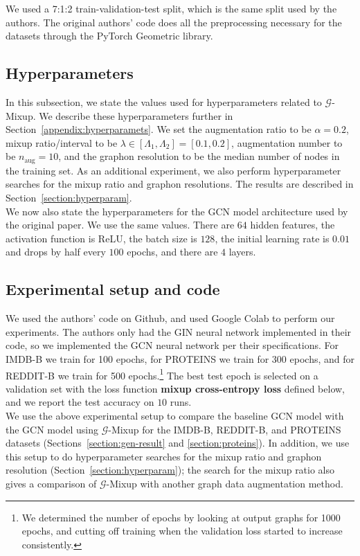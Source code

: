 We used a 7:1:2 train-validation-test split, which is the same split used by the authors. The original authors' code does all the preprocessing necessary for the datasets through the PyTorch Geometric library.

\subsection{Hyperparameters}\label{subsec:hyperparameters}

In this subsection, we state the values used for hyperparameters related to $\mathcal{G}$-Mixup. We describe these hyperparameters further in Section~\ref{appendix:hyperparamets}. We set the augmentation ratio to be $\alpha=0.2$, mixup ratio/interval to be $\lambda\in [\Lambda_1,\Lambda_2]=[0.1,0.2]$, augmentation number to be $n_{\text{aug}}=10$, and the graphon resolution to be the median number of nodes in the training set. As an additional experiment, we also perform hyperparameter searches for the mixup ratio and graphon resolutions. The results are described in Section~\ref{section:hyperparam}.
\\

We now also state the hyperparameters for the GCN model architecture used by the original paper. We use the same values. There are $64$ hidden features, the activation function is ReLU, the batch size is $128$, the initial learning rate is $0.01$ and drops by half every $100$ epochs, and there are $4$ layers.

\subsection{Experimental setup and code}\label{subsec:experimental setup}

We used the authors' code on Github, and used Google Colab to perform our experiments.
The authors only had the GIN neural network implemented in their code, so we implemented the GCN neural network per their specifications. For IMDB-B we train for 100 epochs, for PROTEINS we train for 300 epochs, and for REDDIT-B we train for 500 epochs.\footnote{We determined the number of epochs by looking at output graphs for 1000 epochs, and cutting off training when the validation loss started to increase consistently.} The best test epoch is selected on a validation set with the loss function \textbf{mixup cross-entropy loss} defined below, and we report the test accuracy on $10$ runs.
\\

We use the above experimental setup to compare the baseline GCN model with the GCN model using $\mathcal{G}$-Mixup for the IMDB-B, REDDIT-B, and PROTEINS datasets (Sections~\ref{section:gen-result} and \ref{section:proteins}). In addition, we use this setup to do hyperparameter searches for the mixup ratio and graphon resolution (Section~\ref{section:hyperparam}); the search for the mixup ratio also gives a comparison of $\mathcal{G}$-Mixup with another graph data augmentation method.
\\

